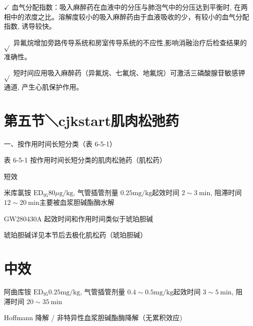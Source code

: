 \documentclass[10pt]{article}
\begin{document}
$\checkmark$ 血气分配指数：吸入麻醉药在血液中的分压与肺泡气中的分压达到平衡时, 在两相中的浓度之比。溶解度较小的吸入麻醉药由于血液吸收的少，有较小的血气分配指数, 诱导较快。

$\sqrt{ }$ 异氟烷增加旁路传导系统和房室传导系统的不应性,影响消融治疗后检查结果的准确性。

$\sqrt{ }$ 短时间应用吸入麻醉药（异氟烷、七氟烷、地氟烷）可激活三磷酸腺苷敏感钾通道, 产生心肌保护作用。

\section*{第五节＼cjkstart肌肉松弛药}
一、按作用时间长短分类（表 6-5-1）

表 6-5-1 按作用时间长短分类的肌肉松驰药（肌松药）

短效

米库氯铵 $\mathrm{ED}_{95} 80 \mu \mathrm{g} / \mathrm{kg}$, 气管插管剂量 $0.25 \mathrm{mg} / \mathrm{kg}$起效时间 $2 \sim 3 \mathrm{~min}$, 阻滞时间 $12 \sim 20 \mathrm{~min}$主要被血浆胆碱酯酶水解

GW280430A 起效时间和作用时间类似于琥珀胆碱

琥珀胆碱详见本节后去极化肌松药（琥珀胆碱）

\section*{中效}
阿曲库铵 $\mathrm{ED}_{95} 0.25 \mathrm{mg} / \mathrm{kg}$, 气管插管剂量 $0.4 \sim 0.5 \mathrm{mg} / \mathrm{kg}$起效时间 $3 \sim 5 \mathrm{~min}$, 阻滞时间 $20 \sim 35 \mathrm{~min}$

Hoffmann 降解 / 非特异性血浆胆碱酯酶降解（无累积效应)
\end{document}
